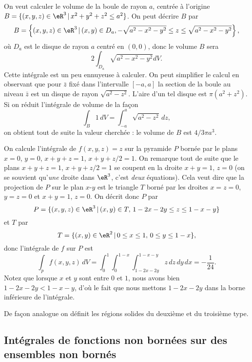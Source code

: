 \begin{example}
On veut calculer le volume de la boule de rayon $a$, centrée à l'origine $B=\{(x,y,z)\in\eR^3\,\vert\, x^2+y^2+z^2\leq a^2 \}$. On peut décrire $B$ par
\[
  B=\left\{(x,y,z)\in\eR^3\,\vert\, (x,y)\in D_a, -\sqrt{a^2-x^2-y^2}\leq z\leq \sqrt{a^2-x^2-y^2}  \right\},
\]
où $D_a$ est le disque de rayon $a$ centré en $(0,0)$, donc le volume $B$ sera
\[
2 \int_{D_a}\sqrt{a^2-x^2-y^2} dV.
\]
Cette intégrale est un peu ennuyeuse à calculer. On peut simplifier le calcul en observant que pour $\bar z$ fixé dans l'intervalle $[-a,a]$ la section de la boule au niveau $\bar z$ est un disque de rayon $\sqrt{a^2-z^2}$. L'aire d'un tel disque est  $\pi (a^2+z^2)$. Si on réduit l'intégrale de volume de la façon
\[
\int_{B} 1\, dV=\int_{-a}^{a}  \sqrt{a^2-z^2}\, dz,
\]
on obtient tout de suite la valeur cherchée : le volume de $B$ est $4/3 \pi a^3$.
\end{example}
\begin{example}
	On calcule l'intégrale de $f(x,y,z)=z$ sur la pyramide $P$ bornée par le plans $x=0$, $y=0$, $x+y+z=1$, $x+y+z/2=1$. On remarque tout de suite que le plans $x+y+z=1$, $x+y+z/2=1$ se coupent en la droite $x+y=1$, $z=0$ (on se souvient qu'\emph{une} droite dans $\eR^3$, c'est \emph{deux} équations). Cela veut dire que la projection de $P$ sur le plan $x$-$y$ est le  triangle $T$ borné par les droites $x=z=0$, $y=z=0$ et $x+y=1$, $z=0$.
On  décrit donc $P$ par
\[
P=\{(x,y,z)\in\eR^3\,\vert\, (x,y)\in T, \, 1-2x-2y\leq z\leq 1-x-y\}
\]
et $T$ par
\[
T=\{(x,y)\in\eR^2\,\vert\, 0\leq x\leq 1,\,  0\leq y\leq 1-x\},
\]
donc l'intégrale de $f$ sur $P$ est
\[
\int_pf(x,y,z)\, dV= \int_{0}^{1}\int_{0}^{1-x}\int_{1-2x-2y}^{1-x-y}z \,dz\,dy\,dx=-\frac{1}{ 24 }.
\]
Notez que lorsque $x$ et $y$ sont entre $0$ et $1$, nous avons bien $1-2x-2y<1-x-y$, d'où le fait que nous mettons $1-2x-2y$ dans la borne inférieure de l'intégrale.
\end{example}

De façon analogue on définit les régions solides du deuxième et du troisième type.

					\subsection[Fonctions et ensembles non bornés]{Intégrales de fonctions non bornées sur des ensembles non bornés}

